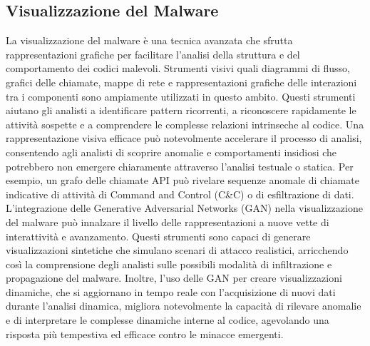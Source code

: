 \subsection{Visualizzazione del Malware}
La visualizzazione del malware è una tecnica avanzata che sfrutta rappresentazioni grafiche per facilitare l'analisi della struttura e del comportamento dei codici malevoli. Strumenti visivi quali diagrammi di flusso, grafici delle chiamate, mappe di rete e rappresentazioni grafiche delle interazioni tra i componenti sono ampiamente utilizzati in questo ambito. Questi strumenti aiutano gli analisti a identificare pattern ricorrenti, a riconoscere rapidamente le attività sospette e a comprendere le complesse relazioni intrinseche al codice.
Una rappresentazione visiva efficace può notevolmente accelerare il processo di analisi, consentendo agli analisti di scoprire anomalie e comportamenti insidiosi che potrebbero non emergere chiaramente attraverso l'analisi testuale o statica. Per esempio, un grafo delle chiamate API può rivelare sequenze anomale di chiamate indicative di attività di Command and Control (C\&C) o di esfiltrazione di dati.
L'integrazione delle Generative Adversarial Networks (GAN) nella visualizzazione del malware può innalzare il livello delle rappresentazioni a nuove vette di interattività e avanzamento. Questi strumenti sono capaci di generare visualizzazioni sintetiche che simulano scenari di attacco realistici, arricchendo così la comprensione degli analisti sulle possibili modalità di infiltrazione e propagazione del malware. Inoltre, l'uso delle GAN per creare visualizzazioni dinamiche, che si aggiornano in tempo reale con l'acquisizione di nuovi dati durante l'analisi dinamica, migliora notevolmente la capacità di rilevare anomalie e di interpretare le complesse dinamiche interne al codice, agevolando una risposta più tempestiva ed efficace contro le minacce emergenti.
\newpage
